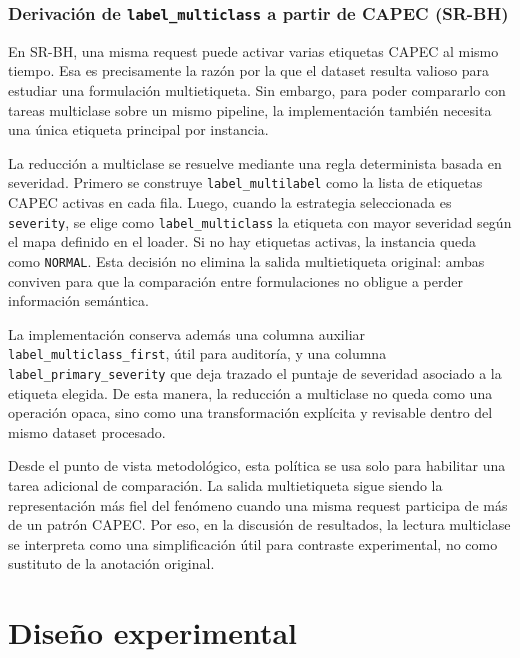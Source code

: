\documentclass[12pt,oneside]{report}
\begin{document}

\subsection{Derivación de \texttt{label\_multiclass} a partir de CAPEC (SR-BH)}
En SR-BH, una misma request puede activar varias etiquetas CAPEC al mismo tiempo. Esa es precisamente la razón por la que el dataset resulta valioso para estudiar una formulación multietiqueta. Sin embargo, para poder compararlo con tareas multiclase sobre un mismo pipeline, la implementación también necesita una única etiqueta principal por instancia.

La reducción a multiclase se resuelve mediante una regla determinista basada en severidad. Primero se construye \texttt{label\_multilabel} como la lista de etiquetas CAPEC activas en cada fila. Luego, cuando la estrategia seleccionada es \texttt{severity}, se elige como \texttt{label\_multiclass} la etiqueta con mayor severidad según el mapa definido en el loader. Si no hay etiquetas activas, la instancia queda como \texttt{NORMAL}. Esta decisión no elimina la salida multietiqueta original: ambas conviven para que la comparación entre formulaciones no obligue a perder información semántica.

La implementación conserva además una columna auxiliar \texttt{label\_multiclass\_first}, útil para auditoría, y una columna \texttt{label\_primary\_severity} que deja trazado el puntaje de severidad asociado a la etiqueta elegida. De esta manera, la reducción a multiclase no queda como una operación opaca, sino como una transformación explícita y revisable dentro del mismo dataset procesado.

Desde el punto de vista metodológico, esta política se usa solo para habilitar una tarea adicional de comparación. La salida multietiqueta sigue siendo la representación más fiel del fenómeno cuando una misma request participa de más de un patrón CAPEC. Por eso, en la discusión de resultados, la lectura multiclase se interpreta como una simplificación útil para contraste experimental, no como sustituto de la anotación original.


\chapter{Diseño experimental}
\end{document}
